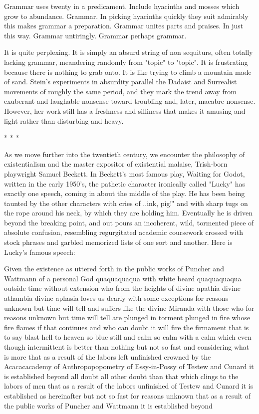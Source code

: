 Grammar uses twenty in a predicament. Include hyacinths and mosses which
grow to abundance.
Grammar. In picking hyacinths quickly they suit admirably this makes
grammar a preparation. Grammar unites parts and praises. In just this way. Grammar
untiringly.
Grammar perhaps grammar.

         It is quite perplexing. It is simply an absurd string of non sequiturs, often totally
lacking grammar, meandering randomly from "topic" to "topic". It
is frustrating because there is nothing to grab onto. It is like trying to climb a mountain
made of sand.
         Stein's experiments in absurdity parallel the Dadaist and Surrealist movements of
roughly the same period, and they mark the trend away from
exuberant and laughable nonsense toward troubling and, later, macabre nonsense.
However, her work still has a freshness and silliness that makes it amusing and light
rather than disturbing and heavy.

                                          *   *   *

        As we move further into the twentieth century, we encounter the philosophy of
existentialism and the master expositor of existential malaise,
Trish-born playwright Samuel Beckett. In Beckett's most famous play, Waiting for
Godot, written in the early 1950's, the pathetic character ironically
called "Lucky" has exactly one speech, coming in about the middle of the play. He has
been being taunted by the other characters with cries of
..ink, pig!" and with sharp tugs on the rope around his neck, by which they are holding
him. Eventually he is driven beyond the breaking point, and out pours an incoherent,
wild, tormented piece of absolute confusion, resembling regurgitated academic
coursework crossed with stock phrases and garbled memorized lists of one sort and
another. Here is Lucky's famous speech:

Given the existence as uttered forth in the public works of Puncher and Wattmann of a
personal God quaquaquaqua with white beard quaquaquaqua outside time without
extension who from the heights of divine apathia divine athambia divine aphasia loves us
dearly with some exceptions for reasons unknown but time will tell and suffers like the
divine Miranda with those who for reasons unknown but time will tell are plunged in
torment plunged in fire whose fire flames if that continues and who can doubt it will fire
the firmament that is to say blast hell to heaven so blue still and calm so calm with a calm
which even though intermittent is better than nothing but not so fast and considering what
is more that as a result of the labors left unfinished crowned by the Acacacacademy of
Anthropopopometry of Essy-in-Possy of Testew and Cunard it is established beyond all
doubt all other doubt than that which clings to the labors of men that as a result of the
labors unfinished of Testew and Cunard it is established as hereinafter but not so fast for
reasons unknown that as a result of the public works of Puncher and Wattmann it is
established beyond





